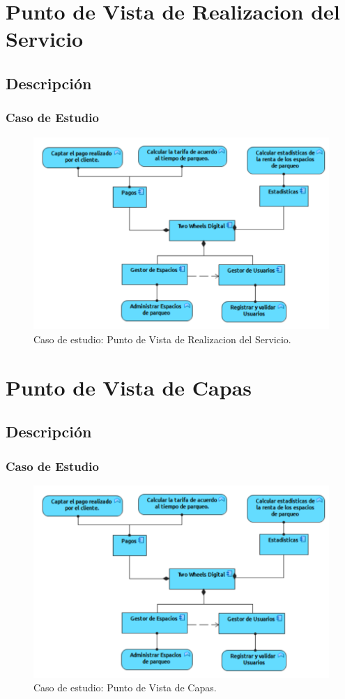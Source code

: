 \section{Punto de Vista de Realizacion del Servicio}
\subsection{Descripción}


\subsubsection{Caso de Estudio}

\begin{figure}[H]
	\centering
	\includegraphics[width=1.0\textwidth]{imagenes/Caso_Estudio/Tecnologia/ComAplicacion.PDF}
	\caption{Caso de estudio: Punto de Vista de Realizacion del Servicio.}
	\label{fig:gap_analysis}
\end{figure}


\section{Punto de Vista de Capas}
\subsection{Descripción}


\subsubsection{Caso de Estudio}


\begin{figure}[H]
	\centering
	\includegraphics[width=1.0\textwidth]{imagenes/Caso_Estudio/Tecnologia/ComAplicacion.PDF}
	\caption{Caso de estudio: Punto de Vista de Capas.}
	\label{fig:gap_analysis}
\end{figure}

